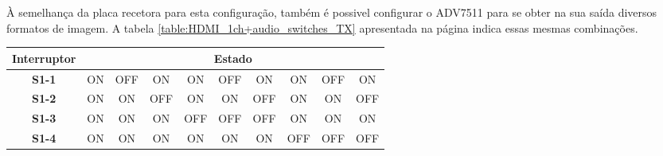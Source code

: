À semelhança da placa recetora para esta configuração, também é possivel configurar o ADV7511 para se obter na sua saída diversos formatos de imagem. A tabela \ref{table:HDMI_1ch+audio_switches_TX} apresentada na página \pageref{table:HDMI_1ch+audio_switches_TX} indica essas mesmas combinações. 
\begin{table}[h!]
	\centering
	\begin{tabular}{|c|c|c|c|c|c|c|c|c|c|}
		\hline
		\textbf{Interruptor}             & \multicolumn{9}{c|}{\textbf{Estado}}                                                                                                                                                                                                                                                                                                                                       \\ \hline
		\textbf{S1-1}                    & ON                                                    & OFF                                                   & ON                                                    & ON                                                    & OFF                                                   & ON                                                    & ON     & OFF     & ON      \\ \hline
		\textbf{S1-2}                    & ON                                                    & ON                                                    & OFF                                                   & ON                                                    & ON                                                    & OFF                                                   & ON     & ON      & OFF     \\ \hline
		\textbf{S1-3}                    & ON                                                    & ON                                                    & ON                                                    & OFF                                                   & OFF                                                   & OFF                                                   & ON     & ON      & ON      \\ \hline
		\textbf{S1-4}                    & ON                                                    & ON                                                    & ON                                                    & ON                                                    & ON                                                    & ON                                                    & OFF    & OFF     & OFF     \\ \hline

\end{tabular}
\end{table}
